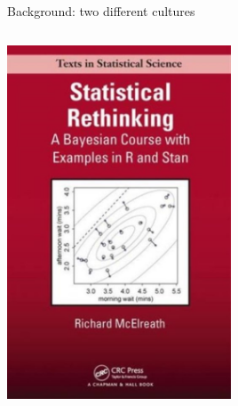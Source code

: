 \documentclass{beamer}
\begin{document}
\begin{frame}{Background: two different cultures \footnotesize{\citep{breiman2001statistical}} }
\begin{columns}
\begin{column}{0.5\textwidth}
\begin{center}
			\includegraphics[width=0.5\textwidth]{../fig/rethinking}      
		\end{center}
	\end{column}
\end{columns}
\end{frame}
\end{document}
